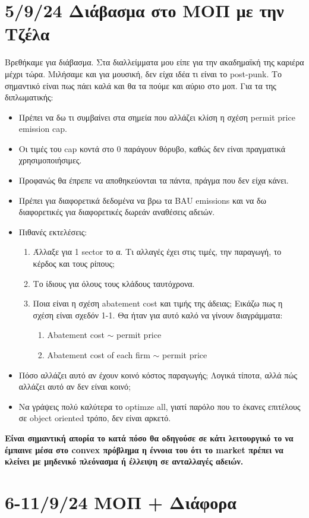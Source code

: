 \documentclass[a4paper,twoside,10pt]{article}
\begin{document}
\section{5/9/24 Διάβασμα στο ΜΟΠ με την Τζέλα}
Βρεθήκαμε για διάβασμα. Στα διαλλείμματα μου είπε για την ακαδημαϊκή της καριέρα μέχρι τώρα. Μιλήσαμε και για μουσική, δεν είχα ιδέα τι είναι το post-punk. Το σημαντικό είναι πως πάει καλά και θα τα πούμε και αύριο στο μοπ. Για τα της διπλωματικής:
\begin{itemize}
	\item Πρέπει να δω τι συμβαίνει στα σημεία που αλλάζει κλίση η σχέση permit price ~ emission cap. 
	\item Οι τιμές του cap κοντά στο 0 παράγουν θόρυβο, καθώς δεν είναι πραγματικά χρησιμοποιήσιμες. 
	\item Προφανώς θα έπρεπε να αποθηκεύονται τα πάντα, πράγμα που δεν είχα κάνει. 
	\item Πρέπει για διαφορετικά δεδομένα να βρω τα BAU emissions και να δω διαφορετικές για διαφορετικές δωρεάν αναθέσεις αδειών.
	\item Πιθανές εκτελέσεις:
	\begin{enumerate}
		\item Άλλαξε για 1 sector το α. Τι αλλαγές έχει στις τιμές, την παραγωγή, το κέρδος και τους ρίπους;
		\item Το ίδιους για όλους τους κλάδους ταυτόχρονα.
		\item Ποια είναι η σχέση abatement cost και τιμής της άδειας; Εικάζω πως η σχέση είναι σχεδόν 1-1. Θα ήταν για αυτό καλό να γίνουν διαγράμματα:
		\begin{enumerate}
			\item Abatement cost $\sim$ permit price
			\item Abatement cost of each firm $\sim$ permit price
		\end{enumerate}
	\end{enumerate}
	\item Πόσο αλλάζει αυτό αν έχουν κοινό κόστος παραγωγής; Λογικά τίποτα, αλλά πώς αλλάζει αυτό αν δεν είναι κοινό;
	\item Να γράψεις πολύ καλύτερα το optimze all, γιατί παρόλο που το έκανες επιτέλους σε object oriented τρόπο, δεν είναι αρκετό. 
\end{itemize}
\textbf{Είναι σημαντική απορία το κατά πόσο θα οδηγούσε σε κάτι λειτουργικό το να έμπαινε μέσα στο convex πρόβλημα η έννοια του ότι το market πρέπει να κλείνει με μηδενικό πλεόνασμα ή έλλειψη σε ανταλλαγές αδειών.}
\section{6-11/9/24 ΜΟΠ + Διάφορα}
\end{document}
